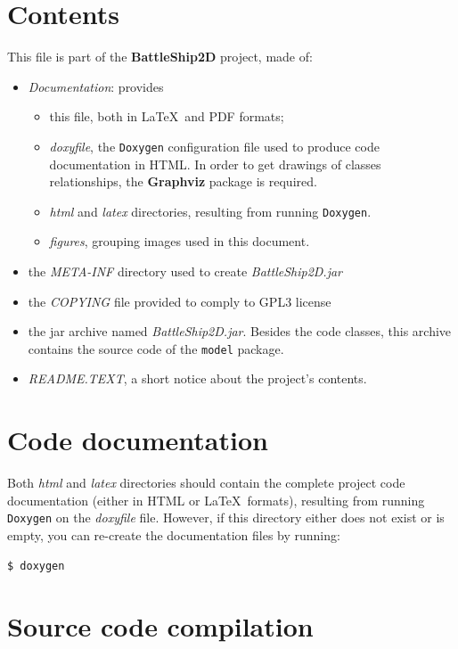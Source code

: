 \documentclass[twoside]{article}
\begin{document}
\section{Contents}
This file is part of the \textbf{BattleShip2D} project, made of:
\begin{itemize}
\item \textit{Documentation}: provides
\begin{itemize}
\item this file, both in \LaTeX\  and PDF formats;
\item \textit{doxyfile}, the \texttt{Doxygen} configuration file used to produce code documentation in HTML. In order to get drawings of classes relationships, the \textbf{Graphviz} package is required.
\item \textit{html} and \textit{latex} directories, resulting from running \texttt{Doxygen}.
\item \textit{figures}, grouping images used in this document.
\end{itemize}
\item the \textit{META-INF} directory used to create \textit{BattleShip2D.jar}
\item the \textit{COPYING} file provided to comply to GPL3 license
\item the jar archive named \textit{BattleShip2D.jar}. Besides the code classes, this archive contains the source code of the \texttt{model} package. 
\item \textit{README.TEXT}, a short notice about the project's contents.
\end{itemize}

\section{Code documentation}
Both \textit{html} and \textit{latex} directories should contain the complete project code documentation (either in HTML or \LaTeX\ formats), resulting from running \texttt{Doxygen} on the \textit{doxyfile} file. However, if this directory either does not exist or is empty, you can re-create the documentation files by running:
\begin{verbatim}
$ doxygen
\end{verbatim}


\section{Source code compilation}
\end{document}
